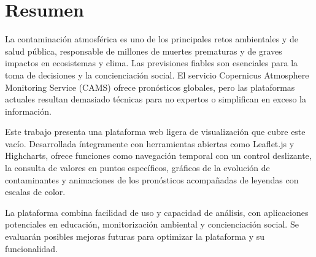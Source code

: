 \thispagestyle{empty}

\chapter*{Resumen}

La contaminación atmosférica es uno de los principales retos ambientales y de salud pública, responsable de millones de muertes prematuras y de graves impactos en ecosistemas y clima. Las previsiones fiables son esenciales para la toma de decisiones y la concienciación social. El servicio Copernicus Atmosphere Monitoring Service (CAMS) ofrece pronósticos globales, pero las plataformas actuales resultan demasiado técnicas para no expertos o simplifican en exceso la información.

Este trabajo presenta una plataforma web ligera de visualización que cubre este vacío. Desarrollada íntegramente con herramientas abiertas como Leaflet.js y Highcharts, ofrece funciones como navegación temporal con un control deslizante, la consulta de valores en puntos específicos, gráficos de la evolución de contaminantes y animaciones de los pronósticos acompañadas de leyendas con escalas de color.

La plataforma combina facilidad de uso y capacidad de análisis, con aplicaciones potenciales en educación, monitorización ambiental y concienciación social. Se evaluarán posibles mejoras futuras para optimizar la plataforma y su funcionalidad.

